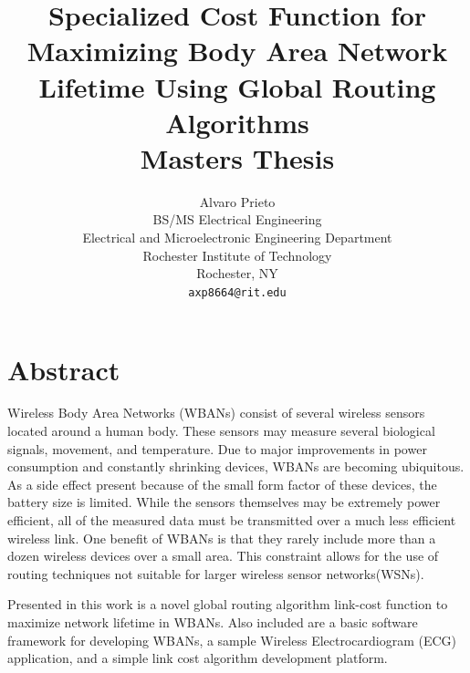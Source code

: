 \documentclass{article}
\begin{document}
\title{Specialized Cost Function for Maximizing Body Area Network Lifetime Using Global Routing Algorithms\\
Masters Thesis}
\author{Alvaro Prieto\\
BS/MS Electrical Engineering\\
Electrical and Microelectronic Engineering Department\\
Rochester Institute of Technology\\
Rochester, NY\\
\texttt{axp8664@rit.edu}}

\thispagestyle{empty}
\maketitle

\pagebreak

\tableofcontents

\pagebreak

\section*{Abstract}
Wireless Body Area Networks (WBANs) consist of several wireless sensors located around a human body. These sensors may measure several biological signals, movement, and temperature. Due to major improvements in power consumption and constantly shrinking devices, WBANs are becoming ubiquitous. As a side effect present because of the small form factor of these devices, the battery size is limited. While the sensors themselves may be extremely power efficient, all of the measured data must be transmitted over a much less efficient wireless link. One benefit of WBANs is that they rarely include more than a dozen wireless devices over a small area. This constraint allows for the use of routing techniques not suitable for larger wireless sensor networks(WSNs).

Presented in this work is a novel global routing algorithm link-cost function to maximize network lifetime in WBANs. Also included are a basic software framework for developing WBANs, a sample Wireless Electrocardiogram (ECG) application, and a simple link cost algorithm development platform.

\pagebreak

\listoffigures

\pagebreak
\end{document}

